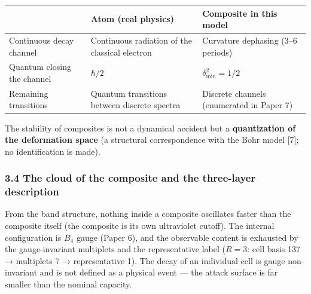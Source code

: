 \documentclass[
]{article}
\newcounter{none} %
\begin{document}
{\def\LTcaptype{none} %
\begin{longtable}[]{@{}
  >{\raggedright\arraybackslash}p{}
  >{\raggedright\arraybackslash}p{}
  >{\raggedright\arraybackslash}p{}@{}}
\toprule\noalign{}
\begin{minipage}[b]{\linewidth}\raggedright
\end{minipage} & \begin{minipage}[b]{\linewidth}\raggedright
Atom (real physics)
\end{minipage} & \begin{minipage}[b]{\linewidth}\raggedright
Composite in this model
\end{minipage} \\
\midrule\noalign{}
\endhead
\bottomrule\noalign{}
\endlastfoot
Continuous decay channel & Continuous radiation of the classical
electron & Curvature dephasing (3--6 periods) \\
Quantum closing the channel & \(\hbar/2\) & \(\delta_{\min}^2=1/2\) \\
Remaining transitions & Quantum transitions between discrete spectra &
Discrete channels (enumerated in Paper 7) \\
\end{longtable}
}

The stability of composites is not a dynamical accident but a
\textbf{quantization of the deformation space} (a structural
correspondence with the Bohr model {[}7{]}; no identification is made).

\subsubsection{3.4 The cloud of the composite and the three-layer
description}\label{the-cloud-of-the-composite-and-the-three-layer-description}

From the band structure, nothing inside a composite oscillates faster
than the composite itself (the composite is its own ultraviolet cutoff).
The internal configuration is \(B_4\) gauge (Paper 6), and the
observable content is exhausted by the gauge-invariant multiplets and
the representative label (\(R=3\): cell basis 137 → multiplets 7 →
representative 1). The decay of an individual cell is gauge
non-invariant and is not defined as a physical event --- the attack
surface is far smaller than the nominal capacity.
\end{document}
